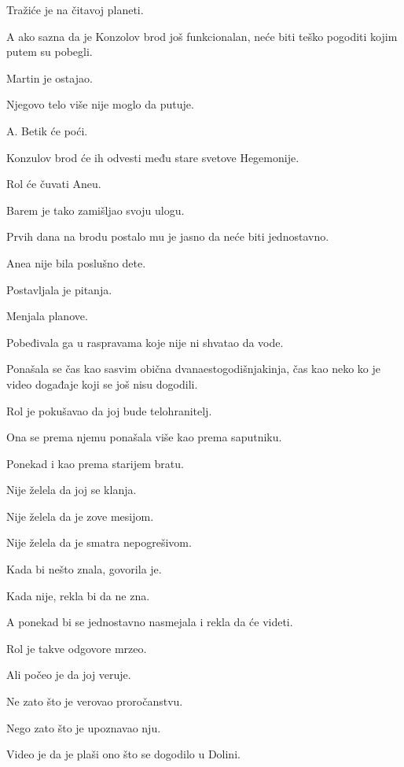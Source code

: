 Tražiće je na čitavoj planeti.

A ako sazna da je Konzolov brod još funkcionalan, neće biti teško pogoditi kojim putem su pobegli.

\bigskip

Martin je ostajao.

Njegovo telo više nije moglo da putuje.

A. Betik će poći.

Konzulov brod će ih odvesti među stare svetove Hegemonije.

Rol će čuvati Aneu.

\bigskip

Barem je tako zamišljao svoju ulogu.

\bigskip

Prvih dana na brodu postalo mu je jasno da neće biti jednostavno.

Anea nije bila poslušno dete.

Postavljala je pitanja.

Menjala planove.

Pobeđivala ga u raspravama koje nije ni shvatao da vode.

Ponašala se čas kao sasvim obična dvanaestogodišnjakinja, čas kao neko ko je video događaje koji se još nisu dogodili.

\bigskip

Rol je pokušavao da joj bude telohranitelj.

Ona se prema njemu ponašala više kao prema saputniku.

Ponekad i kao prema starijem bratu.

\bigskip

Nije želela da joj se klanja.

Nije želela da je zove mesijom.

Nije želela da je smatra nepogrešivom.

Kada bi nešto znala, govorila je.

Kada nije, rekla bi da ne zna.

A ponekad bi se jednostavno nasmejala i rekla da će videti.

\bigskip

Rol je takve odgovore mrzeo.

Ali počeo je da joj veruje.

Ne zato što je verovao proročanstvu.

Nego zato što je upoznavao nju.

\bigskip

Video je da je plaši ono što se dogodilo u Dolini.

